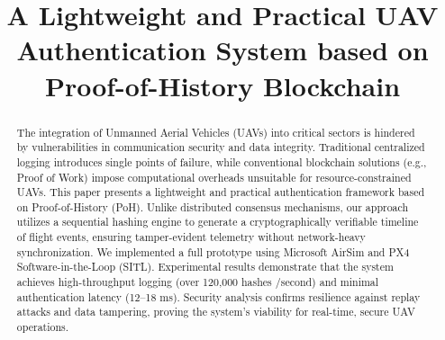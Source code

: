 \documentclass[preprint,12pt]{elsarticle}
\begin{document}
\begin{frontmatter}



\title{A Lightweight and Practical UAV Authentication System based on Proof-of-History Blockchain}



\begin{abstract}
The integration of Unmanned Aerial Vehicles (UAVs) into critical sectors is hindered by vulnerabilities in communication security and data integrity. Traditional centralized logging introduces single points of failure, while conventional blockchain solutions (e.g., Proof of Work) impose computational overheads unsuitable for resource-constrained UAVs. This paper presents a lightweight and practical authentication framework based on Proof-of-History (PoH). Unlike distributed consensus mechanisms, our approach utilizes a sequential hashing engine to generate a cryptographically verifiable timeline of flight events, ensuring tamper-evident telemetry without network-heavy synchronization. We implemented a full prototype using Microsoft AirSim and PX4 Software-in-the-Loop (SITL). Experimental results demonstrate that the system achieves high-throughput logging (over 120,000 hashes /second) and minimal authentication latency (12–18 ms). Security analysis confirms resilience against replay attacks and data tampering, proving the system's viability for real-time, secure UAV operations.
\end{abstract}


\end{frontmatter}
\end{document}
